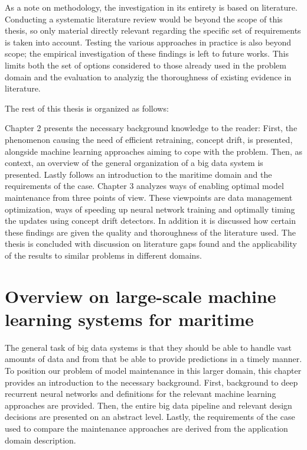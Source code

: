 As a note on methodology, the investigation in its entirety is based on literature. Conducting a systematic literature review would be beyond the scope of this thesis, so only material directly relevant regarding the specific set of requirements is taken into account. Testing the various approaches in practice is also beyond scope; the empirical investigation of these findings is left to future works. This limits both the set of options considered to those already used in the problem domain and the evaluation to analyzig the thoroughness of existing evidence in literature.


The rest of this thesis is organized as follows:

Chapter 2 presents the necessary background knowledge to the reader: First, the phenomenon causing the need of efficient retraining, concept drift, is presented, alongside machine learning approaches aiming to cope with the problem. Then, as context, an overview of the general organization of a big data system is presented. Lastly follows an introduction to the maritime domain and the requirements of the case. Chapter 3 analyzes ways of enabling optimal model maintenance from three points of view. These viewpoints are data management optimization,  ways of speeding up neural network training and optimally timing the updates using concept drift detectors. In addition it is discussed how certain these findings are given the quality and thoroughness of the literature used. The thesis is concluded with discussion on literature gaps found and the applicability of the results to similar problems in different domains.

\chapter[Overview on large-scale machine learning systems for maritime]{Overview on large-scale machine\\ learning systems for maritime}


The general task of big data systems is that they should be able to handle vast amounts of data and from that be able to provide predictions in a timely manner. To position our problem of model maintenance in this larger domain, this chapter provides an introduction to the necessary background. First, background to deep recurrent neural networks and definitions for the relevant machine learning approaches are provided. Then, the entire big data pipeline and relevant design decisions are presented on an abstract level. Lastly, the requirements of the case used to compare the maintenance approaches are derived from the application domain description.

